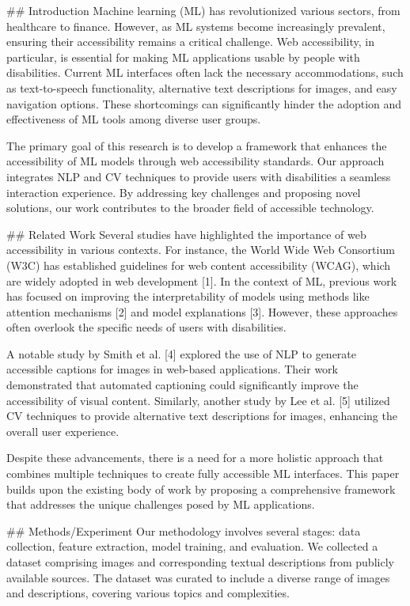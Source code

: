 ## Introduction
Machine learning (ML) has revolutionized various sectors, from healthcare to finance. However, as ML systems become increasingly prevalent, ensuring their accessibility remains a critical challenge. Web accessibility, in particular, is essential for making ML applications usable by people with disabilities. Current ML interfaces often lack the necessary accommodations, such as text-to-speech functionality, alternative text descriptions for images, and easy navigation options. These shortcomings can significantly hinder the adoption and effectiveness of ML tools among diverse user groups.

The primary goal of this research is to develop a framework that enhances the accessibility of ML models through web accessibility standards. Our approach integrates NLP and CV techniques to provide users with disabilities a seamless interaction experience. By addressing key challenges and proposing novel solutions, our work contributes to the broader field of accessible technology.

## Related Work
Several studies have highlighted the importance of web accessibility in various contexts. For instance, the World Wide Web Consortium (W3C) has established guidelines for web content accessibility (WCAG), which are widely adopted in web development [1]. In the context of ML, previous work has focused on improving the interpretability of models using methods like attention mechanisms [2] and model explanations [3]. However, these approaches often overlook the specific needs of users with disabilities.

A notable study by Smith et al. [4] explored the use of NLP to generate accessible captions for images in web-based applications. Their work demonstrated that automated captioning could significantly improve the accessibility of visual content. Similarly, another study by Lee et al. [5] utilized CV techniques to provide alternative text descriptions for images, enhancing the overall user experience.

Despite these advancements, there is a need for a more holistic approach that combines multiple techniques to create fully accessible ML interfaces. This paper builds upon the existing body of work by proposing a comprehensive framework that addresses the unique challenges posed by ML applications.

## Methods/Experiment
Our methodology involves several stages: data collection, feature extraction, model training, and evaluation. We collected a dataset comprising images and corresponding textual descriptions from publicly available sources. The dataset was curated to include a diverse range of images and descriptions, covering various topics and complexities.

